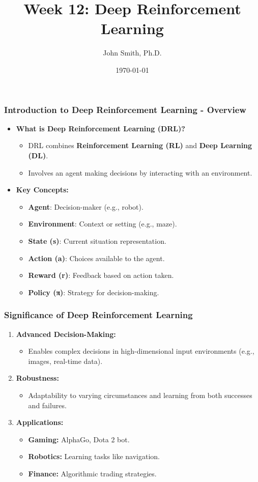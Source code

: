 \documentclass[aspectratio=169]{beamer}
\title[Week 12: Deep Reinforcement Learning]{Week 12: Deep Reinforcement Learning}
\author[J. Smith]{John Smith, Ph.D.}
\institute[University Name]{
  Department of Computer Science\\
  University Name\\
  \vspace{0.3cm}
  Email: email@university.edu\\
  Website: www.university.edu
}
\date{\today}
\begin{document}
\frame{\titlepage}

\begin{frame}[fragile]
    \frametitle{Introduction to Deep Reinforcement Learning - Overview}
    \begin{itemize}
        \item \textbf{What is Deep Reinforcement Learning (DRL)?}
        \begin{itemize}
            \item DRL combines \textbf{Reinforcement Learning (RL)} and \textbf{Deep Learning (DL)}.
            \item Involves an agent making decisions by interacting with an environment.
        \end{itemize}
        \item \textbf{Key Concepts:}
        \begin{itemize}
            \item \textbf{Agent}: Decision-maker (e.g., robot).
            \item \textbf{Environment}: Context or setting (e.g., maze).
            \item \textbf{State (s)}: Current situation representation.
            \item \textbf{Action (a)}: Choices available to the agent.
            \item \textbf{Reward (r)}: Feedback based on action taken.
            \item \textbf{Policy (π)}: Strategy for decision-making.
        \end{itemize}
    \end{itemize}
\end{frame}

\begin{frame}[fragile]
    \frametitle{Significance of Deep Reinforcement Learning}
    \begin{enumerate}
        \item \textbf{Advanced Decision-Making:}
        \begin{itemize}
            \item Enables complex decisions in high-dimensional input environments (e.g., images, real-time data).
        \end{itemize}
        \item \textbf{Robustness:}
        \begin{itemize}
            \item Adaptability to varying circumstances and learning from both successes and failures.
        \end{itemize}
        \item \textbf{Applications:}
        \begin{itemize}
            \item \textbf{Gaming:} AlphaGo, Dota 2 bot.
            \item \textbf{Robotics:} Learning tasks like navigation.
            \item \textbf{Finance:} Algorithmic trading strategies.
        \end{itemize}
    \end{enumerate}
\end{frame}
\end{document}

